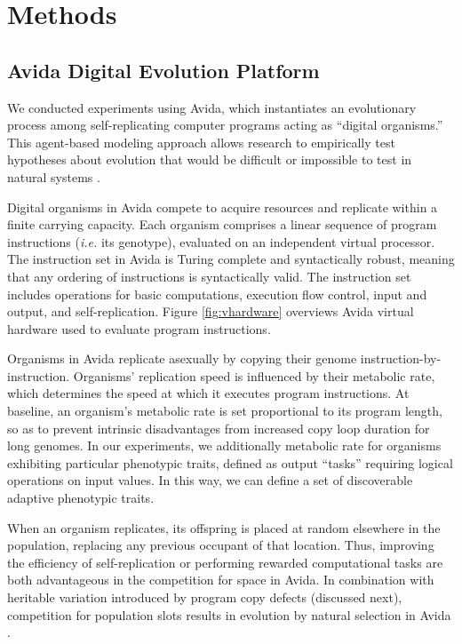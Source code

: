 \section{Methods} \label{sec:methods}

\subsection{Avida Digital Evolution Platform}

We conducted experiments using Avida, which instantiates an evolutionary process among self-replicating computer programs acting as ``digital organisms.''
This agent-based modeling approach allows research to empirically test hypotheses about evolution that would be difficult or impossible to test in natural systems \citep{Ofria:2009avida}.



Digital organisms in Avida compete to acquire resources and replicate within a finite carrying capacity.
Each organism comprises a linear sequence of program instructions (\textit{i.e.} its genotype), evaluated on an independent virtual processor.
The instruction set in Avida is Turing complete and syntactically robust, meaning that any ordering of instructions is syntactically valid.
The instruction set includes operations for basic computations, execution flow control, input and output, and self-replication.
Figure \ref{fig:vhardware} overviews Avida virtual hardware used to evaluate program instructions.

Organisms in Avida replicate asexually by copying their genome instruction-by-instruction.
Organisms' replication speed is influenced by their metabolic rate, which determines the speed at which it executes program instructions.
At baseline, an organism's metabolic rate is set proportional to its program length, so as to prevent intrinsic disadvantages from increased copy loop duration for long genomes.
In our experiments, we additionally metabolic rate for organisms exhibiting particular phenotypic traits, defined as output ``tasks'' requiring logical operations on input values.
In this way, we can define a set of discoverable adaptive phenotypic traits.

When an organism replicates, its offspring is placed at random elsewhere in the population, replacing any previous occupant of that location.
Thus, improving the efficiency of self-replication or performing rewarded computational tasks are both advantageous in the competition for space in Avida.
In combination with heritable variation introduced by program copy defects (discussed next), competition for population slots results in evolution by natural selection in Avida \citep{pennock2007models}.


